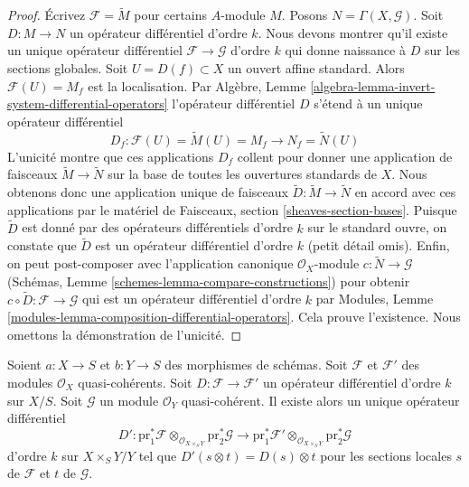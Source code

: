 \begin{proof}
Écrivez $\mathcal{F} = \widetilde{M}$ pour certains $A$-module $M$.
Posons $N = \Gamma(X, \mathcal{G})$. Soit $D : M \to N$ un opérateur différentiel
d'ordre $k$. Nous devons montrer
qu'il existe un unique opérateur différentiel $\mathcal{F} \to \mathcal{G}$ d'ordre $k$
qui donne naissance à $D$ sur les sections globales.
Soit $U = D(f) \subset X$ un ouvert affine standard. Alors $\mathcal{F}(U) = M_f$
est la localisation. Par Algèbre, Lemme \ref{algebra-lemma-invert-system-differential-operators} l'opérateur différentiel
$D$ s'étend à un unique opérateur différentiel
$$
D_f : \mathcal{F}(U) = \widetilde{M}(U) = M_f \to N_f = \widetilde{N}(U)
$$
L'unicité montre que ces applications $D_f$ collent pour donner
une application de faisceaux $\widetilde{M} \to \widetilde{N}$ sur la base de toutes
les ouvertures standards de $X$.
Nous obtenons donc une application unique de faisceaux $\widetilde{D} : \widetilde{M} \to \widetilde{N}$
en accord avec ces applications par le matériel de Faisceaux,
section \ref{sheaves-section-bases}. Puisque $\widetilde{D}$ est donné par des
opérateurs différentiels d'ordre $k$ sur le standard ouvre,
on constate que $\widetilde{D}$ est un
opérateur différentiel d'ordre $k$ (petit détail omis). Enfin,
on peut post-composer avec
l'application canonique $\mathcal{O}_X$-module $c : \widetilde{N} \to \mathcal{G}$
(Schémas, Lemme \ref{schemes-lemma-compare-constructions}) pour obtenir $c \circ \widetilde{D} : \mathcal{F} \to \mathcal{G}$
qui est un opérateur différentiel d'ordre $k$
par Modules, Lemme \ref{modules-lemma-composition-differential-operators}. Cela prouve l'existence.
Nous omettons la démonstration de l'unicité.
\end{proof}

\begin{lemma}
\label{lemma-base-change-differential-operators}
Soient $a : X \to S$ et $b : Y \to S$ des morphismes de schémas.
Soit $\mathcal{F}$ et $\mathcal{F}'$ des modules $\mathcal{O}_X$ quasi-cohérents. Soit
$D : \mathcal{F} \to \mathcal{F}'$ un opérateur différentiel d'ordre $k$
sur $X/S$. Soit $\mathcal{G}$ un module $\mathcal{O}_Y$ quasi-cohérent.
Il existe alors un unique opérateur
différentiel
$$
D' :
\text{pr}_1^*\mathcal{F} \otimes_{\mathcal{O}_{X \times_S Y}}
\text{pr}_2^*\mathcal{G}
\longrightarrow
\text{pr}_1^*\mathcal{F}' \otimes_{\mathcal{O}_{X \times_S Y}}
\text{pr}_2^*\mathcal{G}
$$
d'ordre $k$ sur $X \times_S Y / Y$ tel que
$
D'(s \otimes t) = D(s) \otimes t
$
pour les sections locales $s$ de $\mathcal{F}$ et $t$ de $\mathcal{G}$.
\end{lemma}

